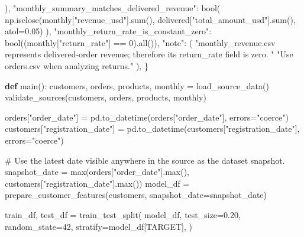 \documentclass[
  indonesian,
  letterpaper,
  DIV=11,
  numbers=noendperiod]{scrreprt}
\newenvironment{Shaded}{\begin{snugshade}}{\end{snugshade}}
\newcommand{\BuiltInTok}[1]{\textcolor[rgb]{0.00,0.23,0.31}{#1}}
\newcommand{\CommentTok}[1]{\textcolor[rgb]{0.37,0.37,0.37}{#1}}
\newcommand{\DecValTok}[1]{\textcolor[rgb]{0.68,0.00,0.00}{#1}}
\newcommand{\FloatTok}[1]{\textcolor[rgb]{0.68,0.00,0.00}{#1}}
\newcommand{\KeywordTok}[1]{\textcolor[rgb]{0.00,0.23,0.31}{\textbf{#1}}}
\newcommand{\NormalTok}[1]{\textcolor[rgb]{0.00,0.23,0.31}{#1}}
\newcommand{\OperatorTok}[1]{\textcolor[rgb]{0.37,0.37,0.37}{#1}}
\newcommand{\StringTok}[1]{\textcolor[rgb]{0.13,0.47,0.30}{#1}}
\begin{document}
\begin{Shaded}
\begin{Highlighting}[]
\NormalTok{        ),}
        \StringTok{"monthly\_summary\_matches\_delivered\_revenue"}\NormalTok{: }\BuiltInTok{bool}\NormalTok{(}
\NormalTok{            np.isclose(monthly[}\StringTok{"revenue\_usd"}\NormalTok{].}\BuiltInTok{sum}\NormalTok{(), delivered[}\StringTok{"total\_amount\_usd"}\NormalTok{].}\BuiltInTok{sum}\NormalTok{(), atol}\OperatorTok{=}\FloatTok{0.05}\NormalTok{)}
\NormalTok{        ),}
        \StringTok{"monthly\_return\_rate\_is\_constant\_zero"}\NormalTok{: }\BuiltInTok{bool}\NormalTok{((monthly[}\StringTok{"return\_rate"}\NormalTok{] }\OperatorTok{==} \DecValTok{0}\NormalTok{).}\BuiltInTok{all}\NormalTok{()),}
        \StringTok{"note"}\NormalTok{: (}
            \StringTok{"monthly\_revenue.csv represents delivered{-}order revenue; therefore its return\_rate field is zero. "}
            \StringTok{"Use orders.csv when analyzing returns."}
\NormalTok{        ),}
\NormalTok{    \}}


\KeywordTok{def}\NormalTok{ main():}
\NormalTok{    customers, orders, products, monthly }\OperatorTok{=}\NormalTok{ load\_source\_data()}
\NormalTok{    validate\_sources(customers, orders, products, monthly)}

\NormalTok{    orders[}\StringTok{"order\_date"}\NormalTok{] }\OperatorTok{=}\NormalTok{ pd.to\_datetime(orders[}\StringTok{"order\_date"}\NormalTok{], errors}\OperatorTok{=}\StringTok{"coerce"}\NormalTok{)}
\NormalTok{    customers[}\StringTok{"registration\_date"}\NormalTok{] }\OperatorTok{=}\NormalTok{ pd.to\_datetime(customers[}\StringTok{"registration\_date"}\NormalTok{], errors}\OperatorTok{=}\StringTok{"coerce"}\NormalTok{)}

    \CommentTok{\# Use the latest date visible anywhere in the source as the dataset snapshot.}
\NormalTok{    snapshot\_date }\OperatorTok{=} \BuiltInTok{max}\NormalTok{(orders[}\StringTok{"order\_date"}\NormalTok{].}\BuiltInTok{max}\NormalTok{(), customers[}\StringTok{"registration\_date"}\NormalTok{].}\BuiltInTok{max}\NormalTok{())}
\NormalTok{    model\_df }\OperatorTok{=}\NormalTok{ prepare\_customer\_features(customers, snapshot\_date}\OperatorTok{=}\NormalTok{snapshot\_date)}

\NormalTok{    train\_df, test\_df }\OperatorTok{=}\NormalTok{ train\_test\_split(}
\NormalTok{        model\_df,}
\NormalTok{        test\_size}\OperatorTok{=}\FloatTok{0.20}\NormalTok{,}
\NormalTok{        random\_state}\OperatorTok{=}\DecValTok{42}\NormalTok{,}
\NormalTok{        stratify}\OperatorTok{=}\NormalTok{model\_df[TARGET],}
\NormalTok{    )}


\end{Highlighting}
\end{Shaded}
\end{document}
